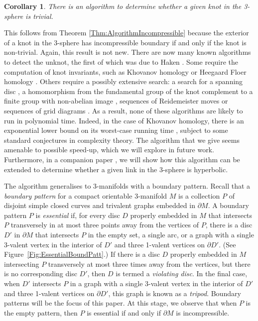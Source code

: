 \documentclass[oneside]{amsart}
\numberwithin{equation}{section}
\theoremstyle{plain}
\newtheorem{corollary}[equation]{Corollary}
\theoremstyle{definition}
\begin{document}
\begin{corollary}
\label{Cor:UnknotRecognition}
There is an algorithm to determine whether a given knot in the 3-sphere is trivial.
\end{corollary}

This follows  from Theorem \ref{Thm:AlgorithmIncompressible} because the exterior of a knot
in the 3-sphere has incompressible boundary if and only if the knot is non-trivial.
Again, this result is not new. There are now many known
algorithms to detect the unknot, the first of which was due to Haken \cite{Haken:Normal}. Some require the computation
of knot invariants, such as Khovanov homology \cite{KronheimerMrowka} or Heegaard Floer homology \cite{OzsvathSzabo, SarkarWang}. Others require a possibly extensive search: a search for a spanning disc \cite{HassLagariasPippenger, Lackenby:EfficientCertification}, a homomorphism from
the fundamental group of the knot complement to a finite group with non-abelian image \cite{Kuperberg:Knottedness}, sequences of Reidemeister moves \cite{Lackenby:Reidemeister} or sequences of grid diagrams \cite{Dynnikov}.
As a result, none of these algorithms
are likely to run in polynomial time. Indeed, in the case of Khovanov homology,
there is an exponential lower bound on its worst-case running time \cite{JaegerVertiganWelsh}, subject to some standard conjectures in complexity theory.
The algorithm that we give seems amenable to possible speed-up, which we will explore
in future work. Furthermore, in a companion paper \cite{Lackenby:LinkHyperbolicity}, we will show how this algorithm can be extended
to determine whether a given link in the 3-sphere is hyperbolic.

The algorithm generalises to 3-manifolds with a boundary pattern. Recall that
a \emph{boundary pattern} for a compact orientable 3-manifold $M$ is a collection $P$ of disjoint simple closed curves
and trivalent graphs embedded in $\partial M$. A boundary pattern $P$ is \emph{essential}  if, for every disc
$D$ properly embedded in $M$ that intersects $P$ transversely in at most three points away from the vertices of $P$,
there is a disc $D'$ in $\partial M$ that intersects $P$ in the empty set, a single arc, or a graph with a single 3-valent vertex
in the interior of $D'$ and three 1-valent vertices on $\partial D'$. (See Figure~\ref{Fig:EssentialBoundPatt}.)
If there is a disc $D$ properly embedded in $M$ intersecting $P$ transversely at most three times away from the vertices, but 
there is no corresponding disc $D'$, then $D$ is termed a \emph{violating disc}. In the final case, 
when $D'$ intersects $P$ in a graph with a single 3-valent vertex
in the interior of $D'$ and three 1-valent vertices on $\partial D'$, this graph is known as a \emph{tripod}.
Boundary patterns will be the focus of this paper. At this stage, we observe that when $P$ is the empty pattern,
then $P$ is essential if and only if $\partial M$ is incompressible.
\end{document}
